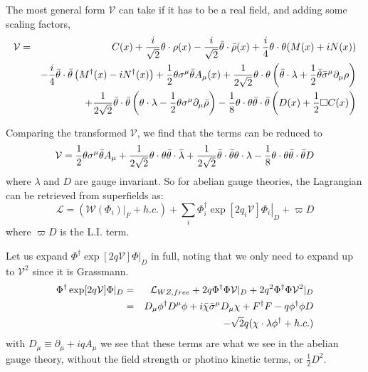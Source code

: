 The most general form $\mathcal{V}$ can take if it has to be a real field, and adding some scaling factors,
\begin{eqnarray}
    \mathcal{V} &=& C(x) + \frac{i}{\sqrt{2}} \theta \cdot \rho (x) - \frac{i}{\sqrt{2}} \Bar{\theta} \cdot \Bar{\rho} (x) + \frac{i}{4}\theta \cdot \theta (M(x) + iN(x)) \nonumber \\ 
    && - \frac{i}{4} \Bar{\theta} \cdot \Bar{\theta} \left( M^\dagger(x) - i N^\dagger(x)\right) + \frac{1}{2} \theta \sigma^\mu \Bar{\theta} A_\mu (x) + \frac{1}{2\sqrt{2}} \theta \cdot \theta \left(\Bar{\theta} \cdot \lambda + \frac{1}{2} \Bar{\theta} \Bar{\sigma}^\mu \partial_\mu \rho \right) \nonumber \\
    && + \frac{1}{2\sqrt{2}} \Bar{\theta} \cdot \Bar{\theta} \left(\theta \cdot \lambda - \frac{1}{2} \theta \sigma^\mu \partial_\mu \Bar{\rho} \right) - \frac{1}{8} \theta \cdot \theta \Bar{\theta} \cdot \Bar{\theta} \left( D(x) + \frac{1}{2}\Box C(x) \right)
\end{eqnarray}

Comparing the transformed $\mathcal{V}$, we find that the terms can be reduced to
\begin{equation}
    \mathcal{V} = \frac{1}{2} \theta \sigma^\mu \Bar{\theta} A_\mu + \frac{1}{2\sqrt{2}} \theta \cdot \theta \Bar{\theta} \cdot \Bar{\lambda} + \frac{1}{2 \sqrt{2}} \Bar{\theta} \cdot \Bar{\theta} \theta \cdot \lambda - \frac{1}{8} \theta \cdot \theta \Bar{\theta} \cdot \Bar{\theta} D
\end{equation}
where $\lambda$ and $D$ are gauge invariant. So for abelian gauge theories, the Lagrangian can be retrieved from superfields as:
\begin{equation}
    \mathcal{L} = \left(\left. \mathcal{W} (\Phi_i)\right\vert_F + h.c. \right) + \sum_i \Phi_i^\dagger \left.\exp[2q_i \mathcal{V}] \Phi_i\right\vert_D + \varpi D
\end{equation}
where $\varpi D$ is the L.I. term. 

Let us expand $\Phi^\dagger \exp[2q\mathcal{V}] \Phi\vert_D$ in full, noting that we only need to expand up to $\mathcal{V}^2$ since it is Grassmann.
\begin{eqnarray}
    \Phi^\dagger \exp[2q\mathcal{V}] \Phi\vert_D &=& \mathcal{L}_{WZ, free} + 2q\Phi^\dagger\Phi\mathcal{V}\vert_D + 2q^2\Phi^\dagger\Phi\mathcal{V}^2\vert_D \nonumber \\
    &=& D_\mu \phi^\dagger D^\mu \phi + i \Bar{\chi} \Bar{\sigma}^\mu D_\mu \chi + F^\dagger F - q\phi^\dagger \phi D \nonumber \\
    && - \sqrt{2} q (\chi \cdot \lambda \phi^\dagger + h.c.)
\end{eqnarray}
with $D_\mu \equiv \partial_\mu + i q A_\mu$
we see that these terms are what we see in the abelian gauge theory, without the field strength or photino kinetic terms, or $\frac{1}{2} D^2$.

